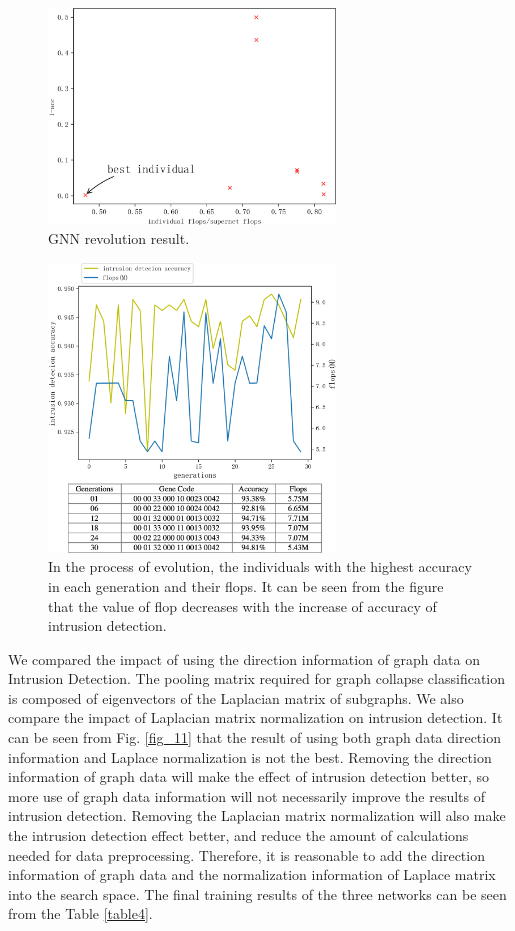 \documentclass[lettersize,journal]{IEEEtran}
\begin{document}
\begin{figure}[!t]
\centering
\includegraphics[width=3in]{gnn_evo}
\caption{GNN revolution result.}
\label{fig_10}
\end{figure}

\begin{figure}[!t]
\centering
\includegraphics[width=3in]{best_all_gen_gnn}
\caption{In the process of evolution, the individuals with the highest accuracy in each generation and their flops. It can be seen from the figure that the value of flop decreases with the increase of accuracy of intrusion detection.}
\label{fig_best_all_gen_gnn}
\end{figure}

We compared the impact of using the direction information of graph data on Intrusion Detection. The pooling matrix required for graph collapse classification is composed of eigenvectors of the Laplacian matrix of subgraphs. We also compare the impact of Laplacian matrix normalization on intrusion detection. It can be seen from Fig. \ref{fig_11} that the result of using both graph data direction information and Laplace normalization is not the best. Removing the direction information of graph data will make the effect of intrusion detection better, so more use of graph data information will not necessarily improve the results of intrusion detection. Removing the Laplacian matrix normalization will also make the intrusion detection effect better, and reduce the amount of calculations needed for data preprocessing. Therefore, it is reasonable to add the direction information of graph data and the normalization information of Laplace matrix into the search space. The final training results of the three networks can be seen from the Table \ref{table4}.
\end{document}
